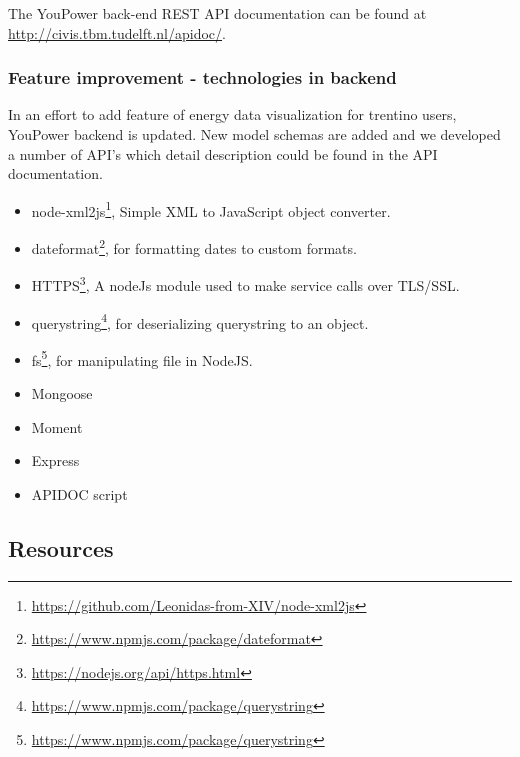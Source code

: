 The YouPower back-end REST API documentation can be found at {\footnotesize\url{http://civis.tbm.tudelft.nl/apidoc/}}. 
% 
\subsubsection{Feature improvement - technologies in backend}
In an effort to add feature of energy data visualization for trentino users, YouPower backend is updated. New model schemas are added  and we developed a number of API's which detail description could be found in the API documentation.
\begin{itemize}
\item node-xml2js\footnote{\url{https://github.com/Leonidas-from-XIV/node-xml2js}}, Simple XML to JavaScript object converter. 
\item dateformat\footnote{\url{https://www.npmjs.com/package/dateformat}}, for formatting dates to custom formats. 
\item HTTPS\footnote{\url{https://nodejs.org/api/https.html}}, A nodeJs module used to make service calls over TLS/SSL. 
\item querystring\footnote{\url{https://www.npmjs.com/package/querystring}}, for deserializing querystring to an object. 
\item fs\footnote{\url{https://www.npmjs.com/package/querystring}}, for manipulating file in NodeJS. 
\item Mongoose
\item Moment
\item Express
\item APIDOC script
\end{itemize}


\subsection{Resources}